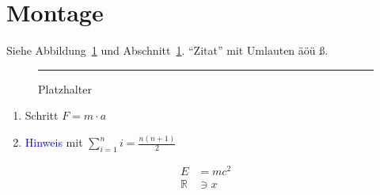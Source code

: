 \documentclass[a4paper,11pt]{article}
\begin{document}
\tableofcontents
\section{Montage}\label{sec:montage}
Siehe Abbildung~\ref{fig:bild} und Abschnitt~\ref{sec:montage}. \enquote{Zitat} mit Umlauten äöü ß.
\begin{figure}[H]
  \centering
  \rule{4cm}{2cm}
  \caption{Platzhalter}\label{fig:bild}
\end{figure}
\begin{enumerate}[label=\arabic*.]
  \item Schritt $F = m \cdot a$
  \item \textcolor{blue}{Hinweis} mit $\sum_{i=1}^n i = \frac{n(n+1)}{2}$
\end{enumerate}
\begin{align}
  E &= mc^2 \\
  \mathbb{R} &\ni x
\end{align}
\end{document}
